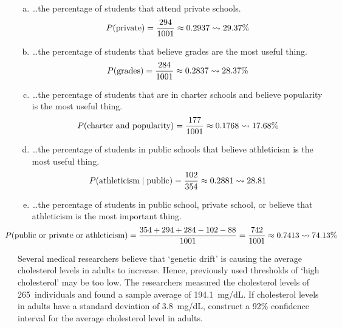 \documentclass[12pt,letterpaper]{exam}
\begin{document}
\begin{questions}
\sol 
\begin{enumerate}[(a)]
\item \dots the percentage of students that attend private schools. \pvspace{0.3cm}
	\[
	P(\text{private})= \dfrac{294}{1001} \approx 0.2937 \rightsquigarrow 29.37\%
	\] \pvspace{0.3cm}

\item \dots the percentage of students that believe grades are the most useful thing. \pvspace{0.3cm}
	\[
	P(\text{grades})= \dfrac{284}{1001} \approx 0.2837 \rightsquigarrow 28.37\%
	\] \pvspace{0.3cm}

\item \dots the percentage of students that are in charter schools and believe popularity is the most useful thing. \pvspace{0.3cm}
	\[
	P(\text{charter and popularity})= \dfrac{177}{1001} \approx 0.1768 \rightsquigarrow 17.68\%
	\] \pvspace{0.3cm}

\item \dots the percentage of students in public schools that believe athleticism is the most useful thing. \pvspace{0.3cm}
	\[
	P(\text{athleticism} \;|\; \text{public})= \dfrac{102}{354} \approx 0.2881 \rightsquigarrow 28.81
	\] \pvspace{0.3cm}

\item \dots the percentage of students in public school, private school, or believe that athleticism is the most important thing. \pvspace{0.3cm}
	\[
	\hspace{-1.2cm} P(\text{public or private or athleticism})= \dfrac{354 + 294 + 284 - 102 - 88}{1001}= \dfrac{742}{1001} \approx 0.7413 \squiggle 74.13\%
	\]
\end{enumerate}



\newpage
\question[10] Several medical researchers believe that `genetic drift' is causing the average cholesterol levels in adults to increase. Hence, previously used thresholds of `high cholesterol' may be too low. The researchers measured the cholesterol levels of 265~individuals and found a sample average of 194.1~mg/dL. If cholesterol levels in adults have a standard deviation of 3.8~mg/dL, construct a 92\% confidence interval for the average cholesterol level in adults. \pvspace{1.5cm}


\end{questions}
\end{document}
